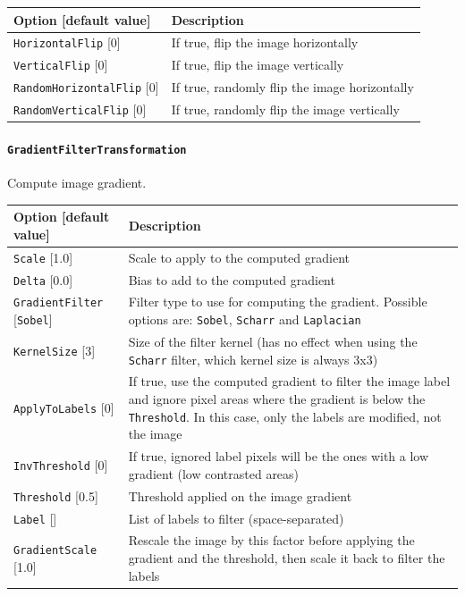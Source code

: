 \documentclass[a4paper,11pt,oneside]{article}
\newcommand{\iponly}{\reversemarginpar
    \marginnote{\color{listletiblue}\normalfont\scriptsize
    {\ttfamily{}\hyperref[sec:N2D2-IP]{\color{listletiblue}N2D2 IP}} \emph{only}}}
\begin{document}
\begin{center}
 \begin{tabular}{| p{5cm} | p{10cm} | }
 \hline
 Option [default value] & Description\\
 \hline\hline
  \lstinline!HorizontalFlip! [0] & If true, flip the image horizontally \\
  \lstinline!VerticalFlip! [0] & If true, flip the image vertically \\
  \lstinline!RandomHorizontalFlip! [0] & If true, randomly flip the image
   horizontally \\
  \lstinline!RandomVerticalFlip! [0] & If true, randomly flip the image
  vertically \\
 \hline
\end{tabular}
\end{center}


\paragraph{\texorpdfstring{%
\lstinline[basicstyle=\ttfamily\bfseries]!GradientFilterTransformation!%
\protect\iponly}{GradientFilterTransformation}}
Compute image gradient.

\begin{center}
 \begin{tabular}{| p{5cm} | p{10cm} | }
 \hline
 Option [default value] & Description\\
 \hline\hline
  \lstinline!Scale! [1.0] & Scale to apply to the computed gradient \\
  \lstinline!Delta! [0.0] & Bias to add to the computed gradient \\
  \lstinline!GradientFilter! [\lstinline!Sobel!] & Filter type to use for
  computing the gradient. Possible options are: \lstinline!Sobel!,
  \lstinline!Scharr! and \lstinline!Laplacian! \\
  \lstinline!KernelSize! [3] & Size of the filter kernel (has no effect when
  using the \lstinline!Scharr! filter, which kernel size is always 3x3) \\
  \lstinline!ApplyToLabels! [0] & If true, use the computed gradient to filter
  the image label and ignore pixel areas where the gradient is below the
   \lstinline!Threshold!. In this case, only the labels are modified, not the
    image \\\hline
  \lstinline!InvThreshold! [0] & If true, ignored label pixels will be the ones
  with a low gradient (low contrasted areas) \\
  \lstinline!Threshold! [0.5] & Threshold applied on the image gradient \\
  \lstinline!Label! [] & List of labels to filter (space-separated) \\
  \lstinline!GradientScale! [1.0] & Rescale the image by this factor before
  applying the gradient and the threshold, then scale it back to filter the
   labels \\
 \hline
\end{tabular}
\end{center}
\end{document}
